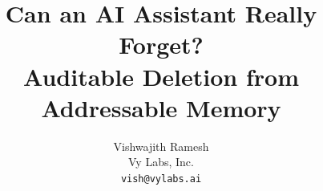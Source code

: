 \documentclass{article}
\title{Can an AI Assistant Really Forget?\\
Auditable Deletion from\\
Addressable Memory}
\author{Vishwajith Ramesh \\
Vy Labs, Inc. \\
\texttt{vish@vylabs.ai}}
\theoremstyle{definition}
\begin{document}
\maketitle
\raggedbottom
{}

\begin{abstract}

\end{abstract}






\appendix

\end{document}
